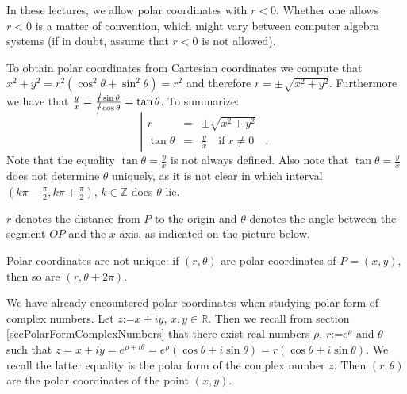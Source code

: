 \documentclass[12pt]{book}
\newcommand{\eqdef}{\textbf{:=}}
\newcommand{\optionalDisplay}[1]{}
\begin{document}
In these lectures, we allow polar coordinates with $ r<0$. Whether one allows $r<0$ is a matter of convention, which might vary between computer algebra systems (if in doubt, assume that $r<0$ is not allowed).

To obtain polar coordinates from Cartesian coordinates we compute that $x^2+y^2= r^2(\cos^2 \theta+\sin^2\theta)=r^2$ and therefore $r=\pm\sqrt{x^2+y^2}$. Furthermore we have that $\frac{y}{x}= \frac{\cancel{r}\sin \theta}{\cancel{r}\cos \theta}=\tan \theta$. To summarize:
\[
\left|\begin{array}{rcl}
r&=&\pm\sqrt{x^2+y^2}\\
\tan\theta&=&\frac{y}{x} \quad \mathrm{if~}x\neq 0 \quad .
\end{array}\right.
\]
Note that the equality $\tan \theta = \frac{y}{x}$ is not always defined. Also note that  $\tan \theta=\frac{y}{x}$ does not determine $\theta$ uniquely, as it is not clear in which interval $(k\pi -\frac{\pi}{2}, k\pi+\frac{\pi}{2})$, $k\in \mathbb Z$ does $\theta$ lie.

$r$ denotes the distance from $P$ to the origin and $\theta$ denotes the angle between the segment $OP$ and the $x$-axis, as indicated on the picture below.

\optionalDisplay{
\psset{xunit=1cm,yunit=1cm}
\begin{pspicture*}(-1.5,-1.5)(5,4)
\psline[linecolor=gray](-1.5,0)(2.5,0) %
\psline[linecolor=gray](0,-1.5)(0,2.5) %
\parametricplot[linecolor=red]{0}{60}{t cos 0.25 mul t 1000 div 1 add mul t sin 0.25 mul t 1000 div 1 add mul} 
\parametricplot[linecolor=red, arrows=->]{0}{780}{t cos 0.55 mul t 1000 div 1 add mul t sin 0.55 mul t 1000 div 1 add mul} 
\psline(0,0)(2,  3.464)
\rput(2,  3.464){$\bullet$}
\rput[lt](2,  3.264){$P= (r\cos \theta, r\sin \theta)$}
\rput(0.35,  0.25){$\theta$}
\end{pspicture*}
} %

Polar coordinates are not unique: if $(r, \theta)$ are polar coordinates of $P=(x,y)$, then so are $(r, \theta+2\pi)$.

We have already encountered polar coordinates when studying polar form of complex numbers. Let $z\eqdef x+iy$, $x,y\in \mathbb R$. Then we recall from section \ref{secPolarFormComplexNumbers} that there exist real numbers $\rho$, $r\eqdef e^\rho$ and $\theta$ such that $z=x+iy= e^{\rho+i\theta}= e^\rho(\cos \theta+i\sin \theta)= r(\cos \theta + i\sin \theta)$. We recall the latter equality is the polar form of the complex number $z$. Then $(r, \theta)$ are the polar coordinates of the point $(x,y)$. 
\end{document}
